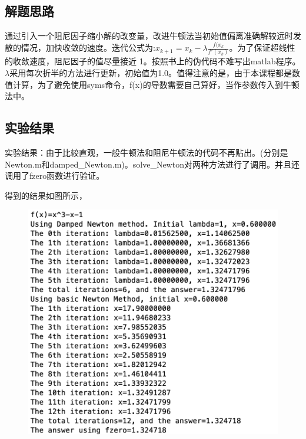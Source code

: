 \documentclass[12pt, utf8, hyperref]{article}
\begin{document}
\subsection*{解题思路}
通过引入一个阻尼因子缩小解的改变量，改进牛顿法当初始值偏离准确解较远时发散的情况，加快收敛的速度。迭代公式为:$x_{k+1} = x_{k} − \lambda \frac{f(x_{k}}{f'(x_{k})}$。为了保证超线性的收敛速度，阻尼因子的值尽量接近 1。按照书上的伪代码不难写出matlab程序。$\lambda$采用每次折半的方法进行更新，初始值为1.0。值得注意的是，由于本课程都是数值计算，为了避免使用syms命令，f(x)的导数需要自己算好，当作参数传入到牛顿法中。

\subsection*{实验结果}
实验结果：由于比较直观，一般牛顿法和阻尼牛顿法的代码不再贴出。(分别是Newton.m和damped\_Newton.m)。solve\_Newton对两种方法进行了调用。并且还调用了fzero函数进行验证。

得到的结果如图所示，
\begin{figure}[H]
	\centering
	\includegraphics[scale=0.5]{photos/1.png}
\end{figure}
\end{document}
